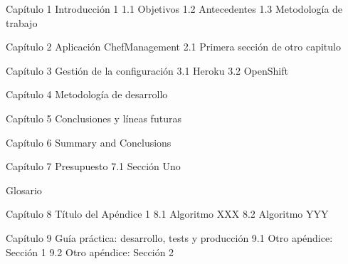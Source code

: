 Capítulo 1 Introducción	1
1.1 Objetivos
1.2 Antecedentes
1.3 Metodología de trabajo

Capítulo 2 Aplicación ChefManagement
2.1 Primera sección de otro capitulo

Capítulo 3 Gestión de la configuración
3.1 Heroku
3.2 OpenShift

Capítulo 4 Metodología de desarrollo

Capítulo 5 Conclusiones y líneas futuras

Capítulo 6 Summary and Conclusions

Capítulo 7 Presupuesto
7.1 Sección Uno

Glosario

Capítulo 8 Título del Apéndice 1
8.1 Algoritmo XXX
8.2 Algoritmo YYY

Capítulo 9 Guía práctica: desarrollo, tests y producción
9.1 Otro apéndice: Sección 1
9.2 Otro apéndice: Sección 2

